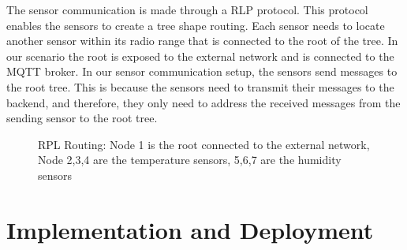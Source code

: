 \documentclass[11pt]{article}
\begin{document}
The sensor communication is made through a RLP protocol. This protocol enables the sensors to create a tree shape routing. Each sensor needs to locate another sensor within its radio range that is connected to the root of the tree. In our scenario the root is exposed to the external network and is connected to the MQTT broker.
In our sensor communication setup, the sensors send messages to the root tree. This is because the sensors need to transmit their messages to the backend, and therefore, they only need to address the received messages from the sending sensor to the root tree. 
\begin{figure}[H]
    \centering
    \caption{RPL Routing: Node 1 is the root connected to the external network, Node 2,3,4 are the temperature sensors, 5,6,7 are the humidity sensors}
\end{figure}

\section{Implementation and Deployment}
\end{document}
